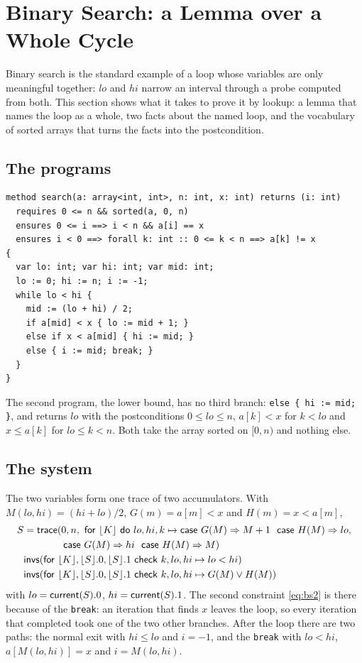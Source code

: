 \section{Binary Search: a Lemma over a Whole Cycle}\label{sec:bisect}

Binary search is the standard example of a loop whose variables are only meaningful together: $lo$ and $hi$
narrow an interval through a probe computed from both. This section shows what it takes to prove it by lookup:
a lemma that names the loop as a whole, two facts about the named loop, and the vocabulary of sorted arrays
that turns the facts into the postcondition.

\subsection{The programs}
\begin{lstlisting}
method search(a: array<int, int>, n: int, x: int) returns (i: int)
  requires 0 <= n && sorted(a, 0, n)
  ensures 0 <= i ==> i < n && a[i] == x
  ensures i < 0 ==> forall k: int :: 0 <= k < n ==> a[k] != x
{
  var lo: int; var hi: int; var mid: int;
  lo := 0; hi := n; i := -1;
  while lo < hi {
    mid := (lo + hi) / 2;
    if a[mid] < x { lo := mid + 1; }
    else if x < a[mid] { hi := mid; }
    else { i := mid; break; }
  }
}
\end{lstlisting}
The second program, the lower bound, has no third branch: \texttt{else \{ hi := mid; \}}, and returns $lo$ with the
postconditions $0 \le lo \le n$, $a[k] < x$ for $k < lo$ and $x \le a[k]$ for $lo \le k < n$. Both take the
array sorted on $[0, n)$ and nothing else.

\subsection{The system}
The two variables form one trace of two accumulators. With $M(lo, hi) = (hi + lo)/2$, $G(m) = a[m] < x$ and
$H(m) = x < a[m]$,
\begin{align}
  S &= \mathsf{trace}(0, n,\ \mathsf{for}\ \lfloor K\rfloor\ \mathsf{do}\ lo, hi, k \mapsto
     \mathsf{case}\ G(M) \Rightarrow M + 1\ \ \mathsf{case}\ H(M) \Rightarrow lo, \nonumber\\
  &\qquad\qquad \mathsf{case}\ G(M) \Rightarrow hi\ \ \mathsf{case}\ H(M) \Rightarrow M) \label{eq:bs1}\\
  &\mathsf{invs}(\mathsf{for}\ \lfloor K\rfloor, \lfloor S\rfloor.0, \lfloor S\rfloor.1\ \mathsf{check}\ k, lo, hi \mapsto lo < hi) \label{eq:bs2a}\\
  &\mathsf{invs}(\mathsf{for}\ \lfloor K\rfloor, \lfloor S\rfloor.0, \lfloor S\rfloor.1\ \mathsf{check}\ k, lo, hi \mapsto G(M) \vee H(M)) \label{eq:bs2}
\end{align}
with $lo = \mathsf{current}(S).0$, $hi = \mathsf{current}(S).1$. The second constraint \eqref{eq:bs2} is there because of the \texttt{break}: an iteration
that finds $x$ leaves the loop, so every iteration that completed took one of the two other branches. After the
loop there are two paths: the normal exit with $hi \le lo$ and $i = -1$, and the \texttt{break} with $lo < hi$,
$a[M(lo, hi)] = x$ and $i = M(lo, hi)$.

